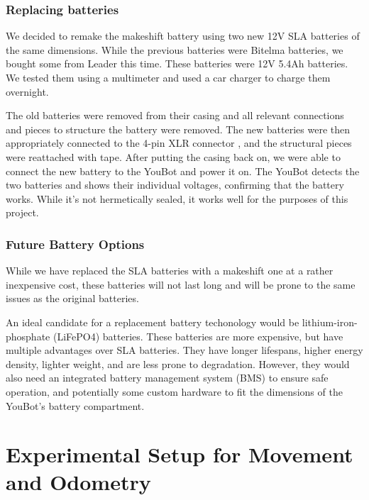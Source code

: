 \documentclass[a4paper, 12pt]{article}
\newif\ifshownotes
\newcommand{\notes}[1]{\ifshownotes\textcolor{blue}{#1}\fi}
\begin{document}
    \subsubsection{Replacing batteries}

    \notes{maybe here we can link to the specific batteries used? the dimensions would be neat as well...}

    We decided to remake the makeshift battery using two new 12V SLA batteries of the same dimensions. While the previous batteries were Bitelma batteries, we bought some from Leader this time. These batteries were 12V 5.4Ah batteries. We tested them using a multimeter and used a car charger to charge them overnight. 
    
    The old batteries were removed from their casing and all relevant connections and pieces to structure the battery were removed. The new batteries were then appropriately connected to the 4-pin XLR connector \notes{maybe mention the pinout here?}, and the structural pieces were reattached with tape. After putting the casing back on, we were able to connect the new battery to the YouBot and power it on. The YouBot detects the two batteries and shows their individual voltages, confirming that the battery works. While it's not hermetically sealed, it works well for the purposes of this project. 

    \subsubsection{Future Battery Options}

    While we have replaced the SLA batteries with a makeshift one at a rather inexpensive cost, these batteries will not last long and will be prone to the same issues as the original batteries. 

    An ideal candidate for a replacement battery techonology would be lithium-iron-phosphate (LiFePO4) batteries. These batteries are more expensive, but have multiple advantages over SLA batteries. They have longer lifespans, higher energy density, lighter weight, and are less prone to degradation. However, they would also need an integrated battery management system (BMS) to ensure safe operation, and potentially some custom hardware to fit the dimensions of the YouBot's battery compartment. 

    \pagebreak
    
    \section{Experimental Setup for Movement and Odometry}
\end{document}

